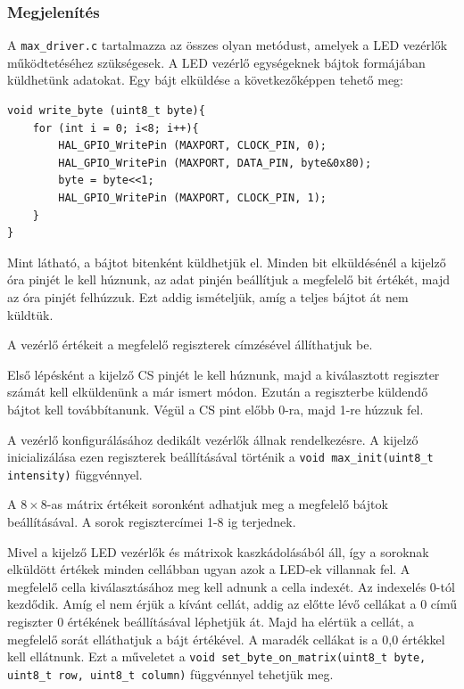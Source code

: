 \documentclass[a4paper, 12pt]{article}
\begin{document}
\subsubsection{Megjelenítés}

A \texttt{max\_driver.c} tartalmazza az összes olyan metódust, amelyek a LED vezérlők működtetéséhez szükségesek.
A LED vezérlő egységeknek bájtok formájában küldhetünk adatokat.
Egy bájt elküldése a következőképpen tehető meg:
\begin{lstlisting}[style=CStyle]
void write_byte (uint8_t byte){
	for (int i = 0; i<8; i++){
		HAL_GPIO_WritePin (MAXPORT, CLOCK_PIN, 0);
		HAL_GPIO_WritePin (MAXPORT, DATA_PIN, byte&0x80);
		byte = byte<<1;
		HAL_GPIO_WritePin (MAXPORT, CLOCK_PIN, 1);
	}
}
\end{lstlisting}
Mint látható, a bájtot bitenként küldhetjük el. Minden bit elküldésénél a kijelző óra pinjét le kell húznunk, az adat pinjén beállítjuk a megfelelő bit értékét, majd az óra pinjét felhúzzuk. Ezt addig ismételjük, amíg a teljes bájtot át nem küldtük.

A vezérlő értékeit a megfelelő regiszterek címzésével állíthatjuk be.

Első lépésként a kijelző CS pinjét le kell húznunk, majd a kiválasztott regiszter számát kell elküldenünk a már ismert módon. Ezután a regiszterbe küldendő bájtot kell továbbítanunk. Végül a CS pint előbb 0-ra, majd 1-re húzzuk fel.

A vezérlő konfigurálásához dedikált vezérlők állnak rendelkezésre. A kijelző inicializálása ezen regiszterek beállításával történik a \texttt{void max\_init(uint8\_t intensity)} függvénnyel.

A $8\times 8$-as mátrix értékeit soronként adhatjuk meg a megfelelő bájtok beállításával. A sorok regisztercímei 1-8 ig terjednek.

Mivel a kijelző LED vezérlők és mátrixok kaszkádolásából áll, így a soroknak elküldött értékek minden cellábban ugyan azok a LED-ek villannak fel. A megfelelő cella kiválasztásához meg kell adnunk a cella indexét. Az indexelés 0-tól kezdődik. Amíg el nem érjük a kívánt cellát, addig az előtte lévő cellákat a 0 című regiszter 0 értékének beállításával léphetjük át. Majd ha elértük a cellát, a megfelelő sorát elláthatjuk a bájt értékével. A maradék cellákat is a 0,0 értékkel kell ellátnunk. Ezt a műveletet a \texttt{void set\_byte\_on\_matrix(uint8\_t byte, uint8\_t row, uint8\_t column)} függvénnyel tehetjük meg.

\bigskip
\end{document}
